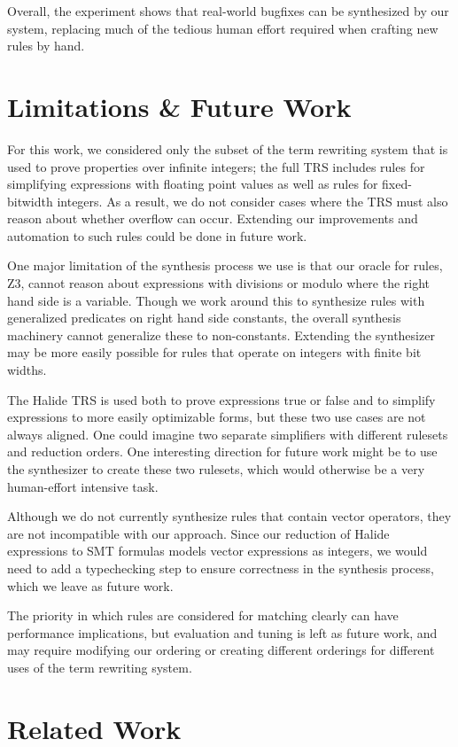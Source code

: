\documentclass[sigplan,10pt,review,anonymous]{acmart}\settopmatter{printfolios=true,printccs=false,printacmref=false}
\begin{document}
Overall, the experiment shows that real-world bugfixes can be synthesized by
our system, replacing much of the tedious human effort required when crafting
new rules by hand.

\section{Limitations \& Future Work}
For this work, we considered only the subset of the term rewriting system that
is used to prove properties over infinite integers; the full TRS includes rules
for simplifying expressions with floating point values as well as rules for
fixed-bitwidth integers.  As a result, we do not consider cases where the TRS
must also reason about whether overflow can occur.  Extending our improvements
and automation to such rules could be done in future work.

One major limitation of the synthesis process we use is that our oracle
for rules, Z3, cannot reason about expressions with divisions or modulo
where the right hand side is a variable.  Though we work around this to
synthesize rules with generalized predicates on right hand side constants,
the overall synthesis machinery cannot generalize these to non-constants.
Extending the synthesizer may be more easily possible for rules that operate
on integers with finite bit widths.

The Halide TRS is used both to prove expressions true or false and to
simplify expressions to more easily optimizable forms, but these two use cases
are not always aligned. One could imagine two separate simplifiers with
different rulesets and reduction orders. One interesting direction for future
work might be to use the synthesizer to create these two rulesets, which would
otherwise be a very human-effort intensive task.

Although we do not currently synthesize rules that contain vector operators,
they are not incompatible with our approach. Since our reduction of Halide
expressions to SMT formulas models vector expressions as integers, we would need
to add a typechecking step to ensure correctness in the synthesis process, which
we leave as future work.

The priority in which rules are considered for matching clearly can have
performance implications, but evaluation and tuning is left as future work, and
may require modifying our ordering or creating different orderings for different
uses of the term rewriting system.

\section{Related Work}
\end{document}
